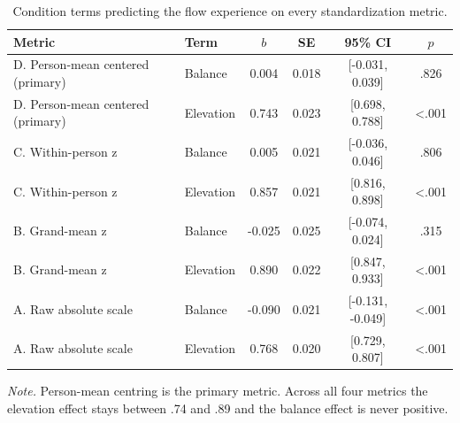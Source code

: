 \begin{table}[!htbp]
\raggedright
\caption{Condition terms predicting the flow experience on every standardization metric.}
\label{tab:sup-standardization}
\footnotesize
\begingroup
\setlength{\tabcolsep}{4pt}
\renewcommand{\arraystretch}{1.08}
\noindent
\begin{tabular*}{\textwidth}{@{\extracolsep{\fill}}llcccc@{}}
\toprule
Metric & Term & $b$ & SE & 95\% CI & $p$ \\
\midrule
D. Person-mean centered (primary) & Balance & 0.004 & 0.018 & [-0.031, 0.039] & .826 \\
D. Person-mean centered (primary) & Elevation & 0.743 & 0.023 & [0.698, 0.788] & <.001 \\
C. Within-person z & Balance & 0.005 & 0.021 & [-0.036, 0.046] & .806 \\
C. Within-person z & Elevation & 0.857 & 0.021 & [0.816, 0.898] & <.001 \\
B. Grand-mean z & Balance & -0.025 & 0.025 & [-0.074, 0.024] & .315 \\
B. Grand-mean z & Elevation & 0.890 & 0.022 & [0.847, 0.933] & <.001 \\
A. Raw absolute scale & Balance & -0.090 & 0.021 & [-0.131, -0.049] & <.001 \\
A. Raw absolute scale & Elevation & 0.768 & 0.020 & [0.729, 0.807] & <.001 \\
\bottomrule
\end{tabular*}
\par\vspace{3pt}\noindent\parbox{\textwidth}{\footnotesize\textit{Note.} Person-mean centring is the primary metric. Across all four metrics the elevation effect stays between .74 and .89 and the balance effect is never positive.}
\endgroup
\end{table}
